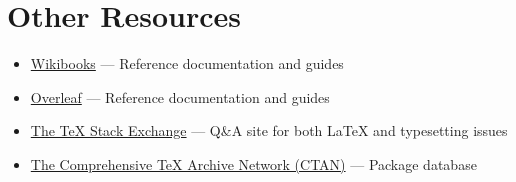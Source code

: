 \documentclass[11pt, twoside]{article}
\begin{document}
\section{Other Resources}
\begin{itemize}
    \item \href{https://en.wikibooks.org/wiki/LaTeX}{Wikibooks} --- Reference documentation and guides
    \item \href{https://www.overleaf.com/learn/latex/Tutorials}{Overleaf} --- Reference documentation and guides
    \item \href{https://tex.stackexchange.com/}{The \TeX{} Stack Exchange} --- Q\&A site for both \LaTeX{} and typesetting issues
    \item \href{https://ctan.org/}{The Comprehensive \TeX{} Archive Network (CTAN)} --- Package database
\end{itemize}
\newpage
\printbibliography
\end{document}
